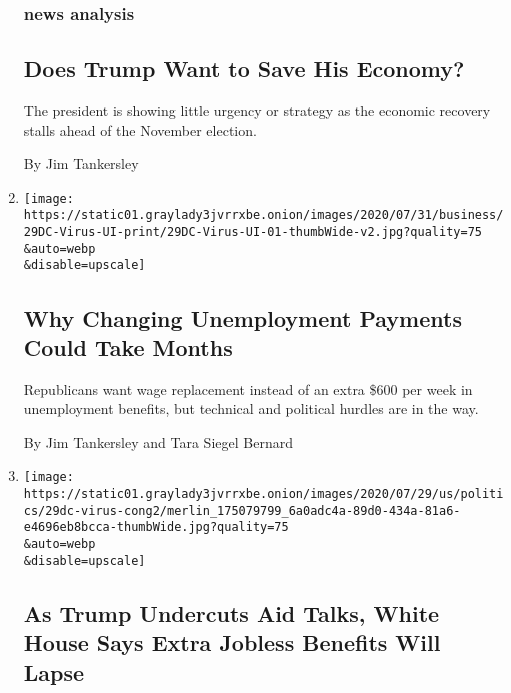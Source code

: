 \begin{enumerate}
  \hypertarget{news-analysis}{%
  \subsubsection{news analysis}\label{news-analysis}}

  \hypertarget{does-trump-want-to-save-his-economy}{%
  \subsection{Does Trump Want to Save His
  Economy?}\label{does-trump-want-to-save-his-economy}}

  The president is showing little urgency or strategy as the economic
  recovery stalls ahead of the November election.

  By Jim Tankersley
\item
  \href{/2020/07/30/business/unemployment-payments-change.html}{}

  \texttt{[image: https://static01.graylady3jvrrxbe.onion/images/2020/07/31/business/29DC-Virus-UI-print/29DC-Virus-UI-01-thumbWide-v2.jpg?quality=75\\\&auto=webp\\\&disable=upscale]}

  \hypertarget{why-changing-unemployment-payments-could-take-months}{%
  \subsection{Why Changing Unemployment Payments Could Take
  Months}\label{why-changing-unemployment-payments-could-take-months}}

  Republicans want wage replacement instead of an extra \$600 per week
  in unemployment benefits, but technical and political hurdles are in
  the way.

  By Jim Tankersley and Tara Siegel Bernard
\item
  \href{/2020/07/29/business/economy/virus-aid-trump.html}{}

  \texttt{[image: https://static01.graylady3jvrrxbe.onion/images/2020/07/29/us/politics/29dc-virus-cong2/merlin\_175079799\_6a0adc4a-89d0-434a-81a6-e4696eb8bcca-thumbWide.jpg?quality=75\\\&auto=webp\\\&disable=upscale]}

  \hypertarget{as-trump-undercuts-aid-talks-white-house-says-extra-jobless-benefits-will-lapse}{%
  \subsection{As Trump Undercuts Aid Talks, White House Says Extra
  Jobless Benefits Will
  Lapse}\label{as-trump-undercuts-aid-talks-white-house-says-extra-jobless-benefits-will-lapse}}


\end{enumerate}
